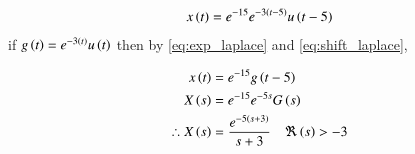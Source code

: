 \documentclass[journal,12pt,twocolumn]{IEEEtran}
\theoremstyle{remark}
\begin{document}
\begin{align}
    x\left(t\right) = e^{-15}e^{-3\left(t - 5\right)}u\left(t - 5\right)
\end{align}
if $g\left(t\right) = e^{-3\left(t\right)}u\left(t\right)$ then by \eqref{eq:exp_laplace} and \eqref{eq:shift_laplace},

\begin{align}
    x\left(t\right) &= e^{-15}g\left(t - 5\right) \\
    X\left(s\right) &= e^{-15}e^{-5s}G\left(s\right)\\
    \therefore X\left(s\right) &= \frac{e^{-5\left(s + 3\right)}}{s + 3} \quad \Re\left(s\right) > -3
\end{align}

\begin{table}[ht]

\end{table}
\end{document}
